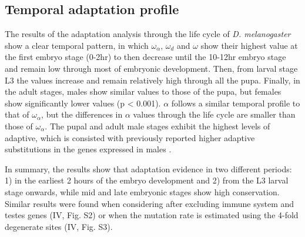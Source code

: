 

\subsection{Temporal adaptation profile}

The results of the adaptation analysis through the life cycle of \textit{D. melanogaster} show a clear temporal pattern, in which $\omega_{\alpha}$, $\omega_{d}$ and $\omega$ show their highest value at the first embryo stage (0-2hr) to then decrease until the 10-12hr embryo stage and remain low through most of embryonic development.
Then, from larval stage L3 the values increase and remain relatively high through all the pupa. Finally, in the adult stages, males show similar values to those of the pupa, but females show significantly lower values (p < 0.001).  
$\alpha$ follows a similar temporal profile to that of $\omega_{\alpha}$, but the differences in $\alpha$ values through the life cycle are smaller than those of $\omega_{\alpha}$.
%
The pupal and adult male stages exhibit the highest levels of adaptive, which is consisted with previously reported higher adaptive substitutions in the genes expressed in males \citep{Proschel2006,Haerty2007}.

In summary, the results show that adaptation evidence in two different periods: 1) in the earliest 2 hours of the embryo development and 2) from the L3 larval stage onwards, while mid and late embryonic stages show high conservation. 
Similar results were found when considering after excluding immune system and testes genes (IV, Fig. S2) or when the mutation rate is estimated using the 4-fold degenerate sites (IV, Fig. S3).

